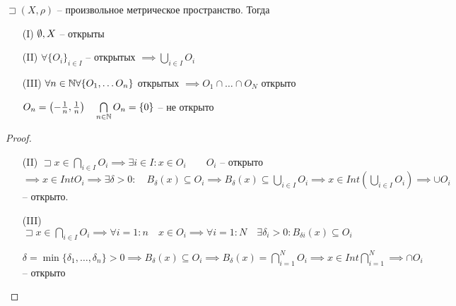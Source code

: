 \begin{theorem}

    $\sqsupset (X, \rho)$ -- произвольное метрическое пространство. Тогда 
    \begin{enumerate}
        \item [(I)]$\emptyset , X$ -- открыты
        \item [(II)] $\forall  \{O_i\}_{i\in I}$ -- открытых $ \implies  \bigcup\limits_{i \in  I} O_i$
        \item [(III)] $\forall n\in \mathbb{N} \forall \{O_1, \ldots O_n\}$ открытых $\implies  O_1\cap \ldots \cap O_N$ открыто

            \begin{note}
                $O_n = \left( -\frac{1}{n}, \frac{1}{n} \right) \quad \bigcap\limits_{n\in \mathbb{N} } O_n = \{0\}$ -- не открыто
            \end{note}
    \end{enumerate}
\end{theorem}
\begin{proof}
    \begin{itemize}
        \item [(II)] $\sqsupset x\in \bigcap\limits_{i \in  I} O_i \implies  \exists i\in I: x\in O_i\qquad O_i$ -- открыто $\implies x\in Int O_i \implies  \exists \delta >0:\quad B_{\delta}(x) \subseteq O_i \implies  B_{\delta}(x) \subseteq \bigcup\limits_{i \in  I}  O_i \implies  x\in Int\left( \bigcup\limits_{i \in  I} O_i \right)  \implies  \cup O_i$ -- открыто.
        \item [(III)] $\sqsupset x\in \bigcap\limits_{i \in  I} O_i \implies \forall i = 1:n\quad x\in O_i \implies  \forall i = 1:N\quad \exists \delta_i>0: B_{\delta i}(x) \subseteq O_i$

            $\delta = \min \{\delta_1, \ldots, \delta_n\} >0 \implies  B_{\delta}(x) \subseteq O_i \implies  B_{\delta}(x) = \bigcap\limits_{i=1} ^N O_i \implies  x\in Int \bigcap\limits_{i =1}^N \implies \cap O_i $ -- открыто
    \end{itemize}
\end{proof}

